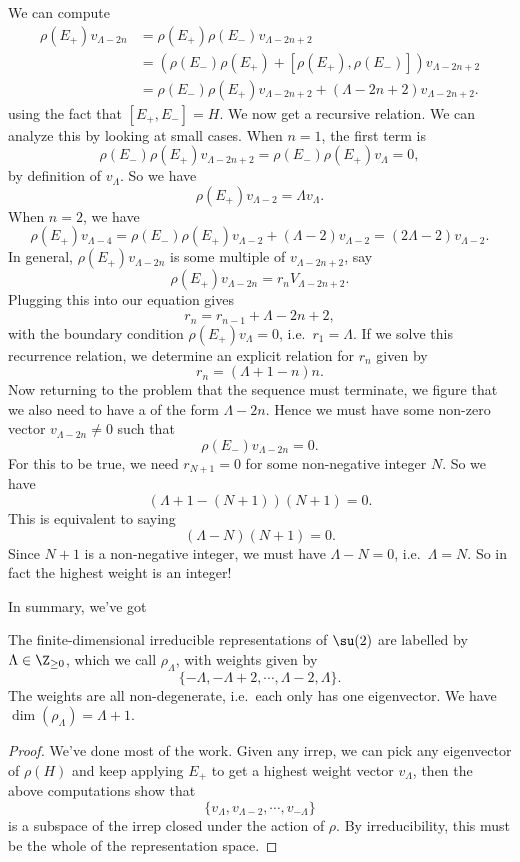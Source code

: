 \documentclass[a4paper]{article}
\begin{document}
We can compute
\begin{align*}
  \rho(E_+) v_{\Lambda - 2n} &= \rho(E_+) \rho(E_-) v_{\Lambda - 2n + 2} \\
  &= (\rho(E_-)\rho(E_+) + [\rho(E_+), \rho(E_-)]) v_{\Lambda - 2n + 2} \\
  &= \rho(E_-) \rho(E_+) v_{\Lambda - 2n + 2} + (\Lambda - 2n + 2)v_{\Lambda - 2n + 2}.
\end{align*}
using the fact that $[E_+, E_-] = H$. We now get a recursive relation. We can analyze this by looking at small cases. When $n = 1$, the first term is
\[
  \rho(E_-)\rho(E_+) v_{\Lambda - 2n + 2} = \rho(E_-) \rho(E_+) v_\Lambda = 0,
\]
by definition of $v_\Lambda$. So we have
\[
  \rho(E_+) v_{\Lambda - 2} = \Lambda v_\Lambda.
\]
When $n = 2$, we have
\[
  \rho(E_+) v_{\Lambda - 4} = \rho(E_-) \rho(E_+) v_{\Lambda - 2} + (\Lambda - 2) v_{\Lambda - 2} = (2\Lambda - 2) v_{\Lambda - 2}.
\]
In general, $\rho(E_+)v_{\Lambda - 2n}$ is some multiple of $v_{\Lambda - 2n + 2}$, say
\[
  \rho(E_+) v_{\Lambda - 2n} = r_n V_{\Lambda - 2n + 2}.
\]
Plugging this into our equation gives
\[
  r_n = r_{n - 1} + \Lambda - 2n + 2,
\]
with the boundary condition $\rho(E_+)v_\Lambda = 0$, i.e.\ $r_1 = \Lambda$. If we solve this recurrence relation, we determine an explicit relation for $r_n$ given by
\[
  r_n = (\Lambda + 1 - n)n.
\]
Now returning to the problem that the sequence must terminate, we figure that we also need to have a  of the form $\Lambda - 2n$. Hence we must have some non-zero vector $v_{\Lambda - 2n} \not= 0$ such that
\[
  \rho(E_-) v_{\Lambda - 2n} = 0.
\]
For this to be true, we need $r_{N + 1} = 0$ for some non-negative integer $N$. So we have
\[
  (\Lambda + 1 - (N + 1))(N + 1) = 0.
\]
This is equivalent to saying
\[
  (\Lambda - N)(N + 1) = 0.
\]
Since $N + 1$ is a non-negative integer, we must have $\Lambda - N = 0$, i.e.\ $\Lambda = N$. So in fact the highest weight is an integer!

In summary, we've got
\begin{prop}
  The finite-dimensional irreducible representations of $\su(2)$ are labelled by $\Lambda \in \Z_{\geq 0}$, which we call $\rho_\Lambda$, with weights given by
  \[
    \{-\Lambda, -\Lambda + 2, \cdots, \Lambda - 2, \Lambda\}.
  \]
  The weights are all non-degenerate, i.e.\ each only has one eigenvector. We have $\dim (\rho_\Lambda) = \Lambda + 1$.
\end{prop}

\begin{proof}
  We've done most of the work. Given any irrep, we can pick any eigenvector of $\rho(H)$ and keep applying $E_+$ to get a highest weight vector $v_\Lambda$, then the above computations show that
  \[
    \{v_\Lambda, v_{\Lambda - 2}, \cdots, v_{-\Lambda}\}
  \]
  is a subspace of the irrep closed under the action of $\rho$. By irreducibility, this must be the whole of the representation space.
\end{proof}
\end{document}
